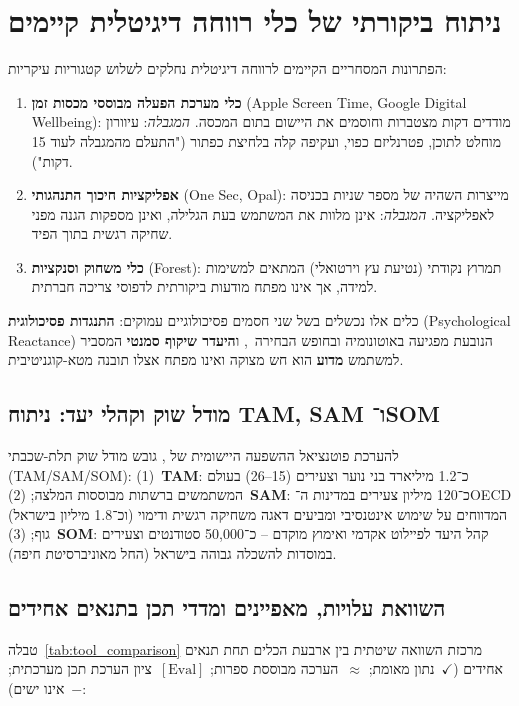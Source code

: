 \section{ניתוח ביקורתי של כלי רווחה דיגיטלית קיימים}
\label{sec:gaps_existing_tools}
הפתרונות המסחריים הקיימים לרווחה דיגיטלית נחלקים לשלוש קטגוריות עיקריות:
\begin{enumerate}
    \item \textbf{כלי מערכת הפעלה מבוססי מכסות זמן} (\textenglish{Apple Screen Time, Google Digital Wellbeing}): מודדים דקות מצטברות וחוסמים את היישום בתום המכסה. \textit{המגבלה}: עיוורון מוחלט לתוכן, פטרנליזם כפוי, ועקיפה קלה בלחיצת כפתור ("התעלם מהמגבלה לעוד 15 דקות").
    \item \textbf{אפליקציות חיכוך התנהגותי} (\textenglish{One Sec, Opal}): מייצרות השהיה של מספר שניות בכניסה לאפליקציה. \textit{המגבלה}: אינן מלוות את המשתמש בעת הגלילה, ואינן מספקות הגנה מפני שחיקה רגשית בתוך הפיד.
    \item \textbf{כלי משחוק וסנקציות} (\textenglish{Forest}): תמרוץ נקודתי (נטיעת עץ וירטואלי) המתאים למשימות למידה, אך אינו מפתח מודעות ביקורתית לדפוסי צריכה חברתית.
\end{enumerate}

כלים אלו נכשלים בשל שני חסמים פסיכולוגיים עמוקים: \textbf{התנגדות פסיכולוגית} (\textenglish{Psychological Reactance}) הנובעת מפגיעה באוטונומיה ובחופש הבחירה~\cite{suls2002social}, ו\textbf{היעדר שיקוף סמנטי} המסביר למשתמש \textbf{מדוע} הוא חש מצוקה ואינו מפתח אצלו תובנה מטא-קוגניטיבית.

\subsection{מודל שוק וקהלי יעד: ניתוח TAM, SAM ו־SOM}
\label{subsec:market_tam_sam_som}
להערכת פוטנציאל ההשפעה היישומית של \projectname{}, גובש מודל שוק תלת-שכבתי (\textenglish{TAM/SAM/SOM}):
(1)~\textbf{TAM}: כ־1.2 מיליארד בני נוער וצעירים (15--26) בעולם המשתמשים ברשתות מבוססות המלצה;
(2)~\textbf{SAM}: כ־120 מיליון צעירים במדינות ה־OECD (וכ־1.8 מיליון בישראל) המדווחים על שימוש אינטנסיבי ומביעים דאגה משחיקה רגשית ודימוי גוף;
(3)~\textbf{SOM}: קהל היעד לפיילוט אקדמי ואימוץ מוקדם -- כ־50,000 סטודנטים וצעירים במוסדות להשכלה גבוהה בישראל (החל מאוניברסיטת חיפה).

\subsection{השוואת עלויות, מאפיינים ומדדי תכן בתנאים אחידים}
\label{subsec:market_feature_cost_comparison}
טבלה~\ref{tab:tool_comparison} מרכזת השוואה שיטתית בין ארבעת הכלים תחת תנאים אחידים ($\checkmark$~נתון מאומת; $\approx$~הערכה מבוססת ספרות; $[\text{Eval}]$~ציון הערכת תכן מערכתית; $-$~אינו ישים):

